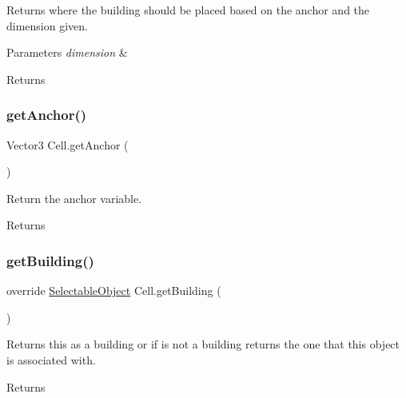Returns where the building should be placed based on the anchor and the dimension given. 


\begin{DoxyParams}{Parameters}
{\em dimension} & \\
\hline
\end{DoxyParams}
\begin{DoxyReturn}{Returns}

\end{DoxyReturn}
\mbox{\label{class_cell_a8cb44e58153a75e75ee98790f51616e8}} 
\subsubsection{\texorpdfstring{get\+Anchor()}{getAnchor()}}
{\footnotesize\ttfamily Vector3 Cell.\+get\+Anchor (\begin{DoxyParamCaption}{ }\end{DoxyParamCaption})}



Return the anchor variable. 

\begin{DoxyReturn}{Returns}

\end{DoxyReturn}
\mbox{\label{class_cell_ab32941221f7e2df38227961c8d8dbfec}} 
\subsubsection{\texorpdfstring{get\+Building()}{getBuilding()}}
{\footnotesize\ttfamily override \mbox{\hyperlink{class_selectable_object}{Selectable\+Object}} Cell.\+get\+Building (\begin{DoxyParamCaption}{ }\end{DoxyParamCaption})\hspace{0.3cm}{\ttfamily [virtual]}}



Returns this as a building or if is not a building returns the one that this object is associated with. 

\begin{DoxyReturn}{Returns}

\end{DoxyReturn}


